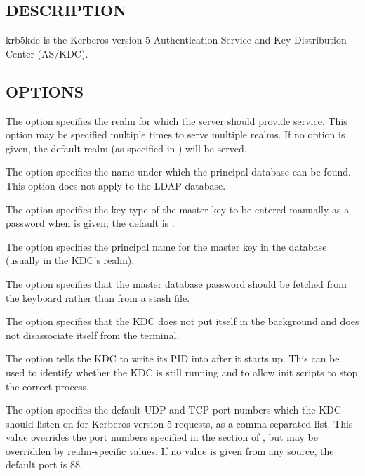 \documentclass[letterpaper,10pt,english]{sphinxmanual}
\begin{document}
\subsection{DESCRIPTION}
\label{\detokenize{admin/admin_commands/krb5kdc:description}}
krb5kdc is the Kerberos version 5 Authentication Service and Key
Distribution Center (AS/KDC).


\subsection{OPTIONS}
\label{\detokenize{admin/admin_commands/krb5kdc:options}}
The   option specifies the realm for which the server
should provide service.  This option may be specified multiple times
to serve multiple realms.  If no  option is given, the default
realm (as specified in {\hyperref[\detokenize{admin/conf_files/krb5_conf:krb5-conf-5}]{}}) will be served.

The   option specifies the name under which the
principal database can be found.  This option does not apply to the
LDAP database.

The   option specifies the key type of the master key
to be entered manually as a password when  is given; the default
is .

The   option specifies the principal name for the
master key in the database (usually  in the KDC’s realm).

The  option specifies that the master database password should
be fetched from the keyboard rather than from a stash file.

The  option specifies that the KDC does not put itself in the
background and does not disassociate itself from the terminal.

The   option tells the KDC to write its PID into
 after it starts up.  This can be used to identify whether
the KDC is still running and to allow init scripts to stop the correct
process.

The   option specifies the default UDP and TCP port
numbers which the KDC should listen on for Kerberos version 5
requests, as a comma-separated list.  This value overrides the port
numbers specified in the {\hyperref[\detokenize{admin/conf_files/kdc_conf:kdcdefaults}]{}} section of
{\hyperref[\detokenize{admin/conf_files/kdc_conf:kdc-conf-5}]{}}, but may be overridden by realm-specific values.
If no value is given from any source, the default port is 88.
\end{document}
